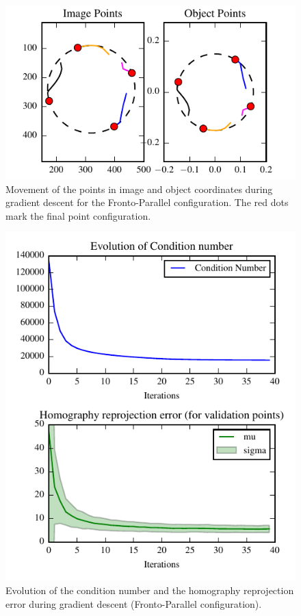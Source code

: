 \documentclass[letterpaper, 10 pt, conference]{ieeeconf}  %
\begin{document}
	
	\begin{figure}[t]
		\begin{center}
			\includegraphics[width=\columnwidth]{img/image_control_points.pdf}
			\caption{\label{fig:homography_results} Movement of the points in image and object coordinates during gradient descent for the Fronto-Parallel configuration. The red dots mark the final point configuration.}
		\end{center}
	\end{figure}
	
	\begin{figure}[t]
		\begin{center}
			\includegraphics[width=\columnwidth]{img/homography_fronto_parallel.pdf}
			\caption{\label{fig:homography_results} Evolution of the condition number and the homography reprojection error during gradient descent (Fronto-Parallel configuration).}
		\end{center}
	\end{figure}
	
\end{document}
